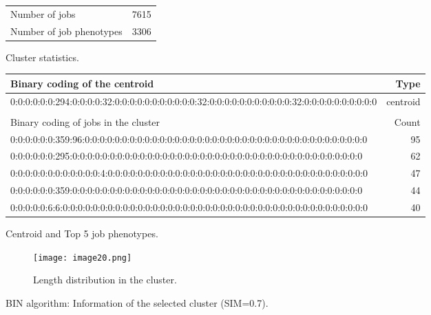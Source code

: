 \documentclass{jhps}
\begin{document}
\begin{cluster}
	\begin{subtable}{\textwidth}
		\centering
		\begin{tabular}{lr}
			Number of jobs & 7615 \\
			Number of job phenotypes & 3306 \\
		\end{tabular}
		\caption{Cluster statistics.}
		\label{cluster:bin_all:stats}
	\end{subtable}
	\medskip
	\begin{subtable}{\textwidth}
		\centering
		\begin{tiny}
			\begin{tabular}{l|r}
				\rowcolor{tblhead}
				Binary coding of the centroid                                                                    &  Type     \\
				\hline
				0:0:0:0:0:0:294:0:0:0:0:32:0:0:0:0:0:0:0:0:0:0:0:32:0:0:0:0:0:0:0:0:0:0:0:32:0:0:0:0:0:0:0:0:0:0 &  centroid \\
				\multicolumn{2}{l}{}                                                                             \\
				\rowcolor{tblhead}
				Binary coding of jobs in the cluster                                                             &  Count    \\
				\hline
				0:0:0:0:0:0:359:96:0:0:0:0:0:0:0:0:0:0:0:0:0:0:0:0:0:0:0:0:0:0:0:0:0:0:0:0:0:0:0:0:0:0:0:0:0:0   &  95       \\
				0:0:0:0:0:0:295:0:0:0:0:0:0:0:0:0:0:0:0:0:0:0:0:0:0:0:0:0:0:0:0:0:0:0:0:0:0:0:0:0:0:0:0:0:0:0    &  62       \\
				0:0:0:0:0:0:0:0:0:0:0:0:4:0:0:0:0:0:0:0:0:0:0:0:0:0:0:0:0:0:0:0:0:0:0:0:0:0:0:0:0:0:0:0:0:0:0:0  &  47       \\
				0:0:0:0:0:0:359:0:0:0:0:0:0:0:0:0:0:0:0:0:0:0:0:0:0:0:0:0:0:0:0:0:0:0:0:0:0:0:0:0:0:0:0:0:0:0    &  44       \\
				0:0:0:0:0:6:6:0:0:0:0:0:0:0:0:0:0:0:0:0:0:0:0:0:0:0:0:0:0:0:0:0:0:0:0:0:0:0:0:0:0:0:0:0:0:0:0:0  &  40       \\
			\end{tabular}
		\end{tiny}
		\caption{Centroid and Top 5 job phenotypes.}
		\label{cluster:bin_all:top_jobs}
	\end{subtable}
	\medskip
	\begin{subfigure}{\textwidth}
		\centering
		\texttt{[image: image20.png]}
		\caption{Length distribution in the cluster.}
		\label{cluster:bin_all:length}
	\end{subfigure}
	\caption{BIN algorithm: Information of the selected cluster (SIM=0.7).}
	\label{cluster:bin_all}
\end{cluster}
\end{document}
